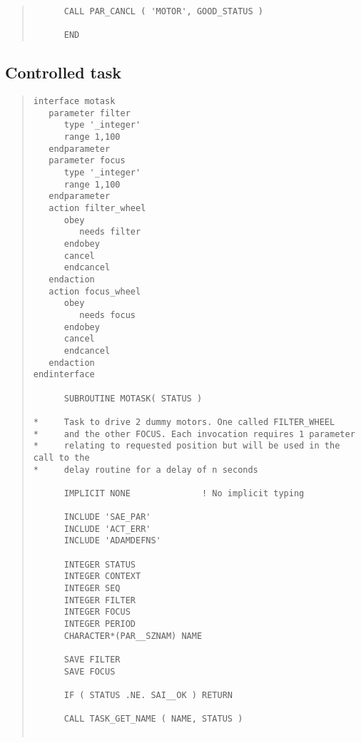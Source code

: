 \documentclass[twoside,11pt]{article}
\renewcommand{\_}{\texttt{\symbol{95}}}
\begin{document}
\begin{quote}
\begin{verbatim}
      CALL PAR_CANCL ( 'MOTOR', GOOD_STATUS )

      END

\end{verbatim} \end{quote} \normalsize

\subsection{Controlled task}

\small \begin{quote} \begin{verbatim}
interface motask
   parameter filter
      type '_integer'
      range 1,100
   endparameter
   parameter focus
      type '_integer'
      range 1,100
   endparameter
   action filter_wheel
      obey
         needs filter
      endobey
      cancel
      endcancel
   endaction
   action focus_wheel
      obey
         needs focus
      endobey
      cancel
      endcancel
   endaction
endinterface

      SUBROUTINE MOTASK( STATUS )

*     Task to drive 2 dummy motors. One called FILTER_WHEEL
*     and the other FOCUS. Each invocation requires 1 parameter
*     relating to requested position but will be used in the call to the
*     delay routine for a delay of n seconds

      IMPLICIT NONE              ! No implicit typing

      INCLUDE 'SAE_PAR'  
      INCLUDE 'ACT_ERR'  
      INCLUDE 'ADAMDEFNS'

      INTEGER STATUS
      INTEGER CONTEXT
      INTEGER SEQ
      INTEGER FILTER
      INTEGER FOCUS
      INTEGER PERIOD
      CHARACTER*(PAR__SZNAM) NAME

      SAVE FILTER
      SAVE FOCUS

      IF ( STATUS .NE. SAI__OK ) RETURN

      CALL TASK_GET_NAME ( NAME, STATUS )


\end{verbatim}
\end{quote}
\end{document}
